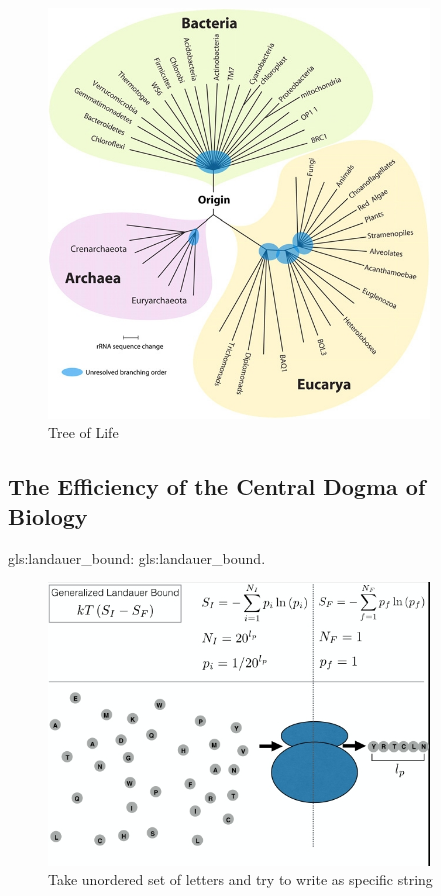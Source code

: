 \documentclass[]{article}
\begin{document}
\begin{figure}[H]
	\caption[Tree of Life]{Tree of Life\cite{nair2012woese}}\label{fig:TOL} 
	\includegraphics[width=0.9\textwidth]{TOL}
\end{figure}

\subsection{The Efficiency of the Central Dogma of Biology}

\gls{gls:landauer_bound}: \glsdesc{gls:landauer_bound}. 

\begin{figure}[H]
	\caption[Take unordered set of letters and try to write as specific string]{Take unordered set of letters and try to write as specific string\cite{kempes2017thermodynamic}}\label{fig:LandauerRibosome} 
	\includegraphics[width=0.9\textwidth]{LandauerRibosome}
\end{figure}
\end{document}
